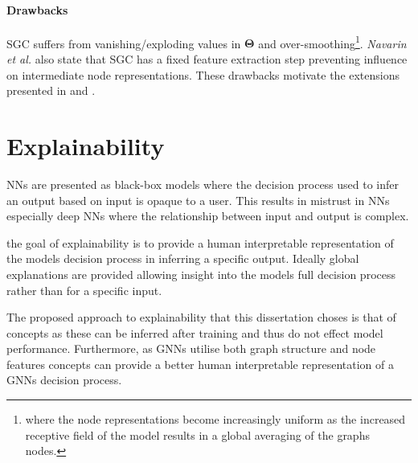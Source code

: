 \paragraph{Drawbacks}
SGC suffers from vanishing/exploding values in $\bm{\Theta}$ and over-smoothing\footnote{where the node representations become increasingly uniform as the increased receptive field of the model results in a global averaging of the graphs nodes.}.
\textit{Navarin et al.}\cite{navarin2020linear} also state that SGC has a fixed feature extraction step preventing influence on intermediate node representations.
These drawbacks motivate the extensions presented in  and .




\section{Explainability}




NNs are presented as black-box models where the decision process used to infer an output based on input is opaque to a user.
This results in mistrust in NNs especially deep NNs where the relationship between input and output is complex.

the goal of explainability is to provide a human interpretable representation of the models decision process in inferring a specific output.
Ideally global explanations are provided allowing insight into the models full decision process rather than for a specific input.

The proposed approach to explainability that this dissertation choses is that of concepts as these can be inferred after training and thus do not effect model performance.
Furthermore, as GNNs utilise both graph structure and node features concepts can provide a better human interpretable representation of a GNNs decision process.

